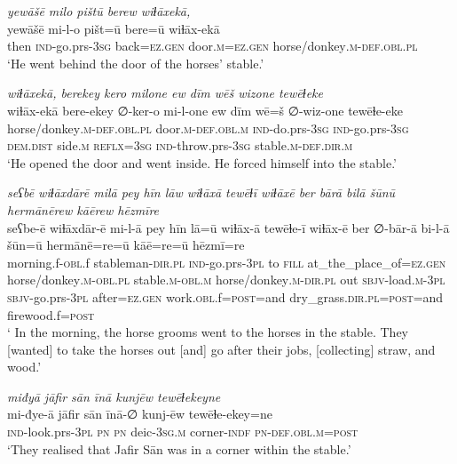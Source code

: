 \ea \label{ŠJ.63}
\textit{yewāšē milo pištū berew wiɫāxekā,} \\ 
\gll yewāšē mi-l-o pišt=ū bere=ū wiɫāx-ekā \\ 
 then \textsc{ind-}go.prs\textsc{-3sg} back\textsc{=ez.gen} door\textsc{.m}\textsc{=ez.gen} horse/donkey\textsc{.m}\textsc{-def}\textsc{.obl}\textsc{.pl} \\ 
\glt `He went behind the door of the horses’ stable.'
\z 
 
\ea \label{ŠJ.64}
\textit{wiɫāxekā, berekey kero milone ew dīm wēš wizone tewēɫeke} \\ 
\gll wiɫāx-ekā bere-ekey ∅-ker-o mi-l-one ew dīm wē=š ∅-wiz-one tewēɫe-eke \\ 
 horse/donkey\textsc{.m}\textsc{-def}\textsc{.obl}\textsc{.pl} door\textsc{.m}\textsc{-def}\textsc{.obl}\textsc{.m} \textsc{ind-}do.prs\textsc{-3sg} \textsc{ind-}go.prs\textsc{-3sg} \textsc{dem.dist} side\textsc{.m} \textsc{reflx}\textsc{=3sg} \textsc{ind-}throw.prs\textsc{-3sg} stable\textsc{.m}\textsc{-def}\textsc{.dir}\textsc{.m} \\ 
\glt `He opened the door and went inside. He forced himself into the stable.'
\z 
 
\ea \label{ŠJ.66}
\textit{seʕbē wiɫāxdārē milā pey hīn lāw wiɫāxā tewēɫī wiɫāxē ber bārā bilā šūnū hermānērew kāērew hēzmīre} \\ 
\gll seʕbe-ē wiɫāxdār-ē mi-l-ā pey hīn lā=ū wiɫāx-ā tewēɫe-ī wiɫāx-ē ber ∅-bār-ā bi-l-ā šūn=ū hermānē=re=ū kāē=re=ū hēzmī=re \\ 
 morning.f\textsc{-obl}.f stableman\textsc{-dir}\textsc{.pl} \textsc{ind-}go.prs\textsc{-3pl} to \textsc{fill} at\_the\_place\_of\textsc{=ez.gen} horse/donkey\textsc{.m}\textsc{-obl}\textsc{.pl} stable\textsc{.m}\textsc{-obl}\textsc{.m} horse/donkey\textsc{.m}\textsc{-dir}\textsc{.pl} out \textsc{sbjv-}load\textsc{.m}\textsc{-3pl} \textsc{sbjv-}go.prs\textsc{-3pl} after\textsc{=ez.gen} work\textsc{.obl}.f\textsc{=\textsc{post}}=and dry\_grass\textsc{.dir}\textsc{.pl}\textsc{=\textsc{post}}=and firewood.f\textsc{=\textsc{post}} \\ 
\glt ` In the morning, the horse grooms went to the horses in the stable. They [wanted] to take the horses out [and] go after their jobs, [collecting] straw, and wood.'
\z 
 
\ea \label{ŠJ.67}
\textit{miđyā jāfir sān īnā kunjēw tewēɫekeyne} \\ 
\gll mi-đye-ā jāfir sān īnā-∅ kunj-ēw tewēɫe-ekey=ne \\ 
 \textsc{ind-}look.prs\textsc{-3pl} \textsc{pn} \textsc{pn} deic\textsc{-3sg}\textsc{.m} corner\textsc{-indf} \textsc{pn}\textsc{-def}\textsc{.obl}\textsc{.m}\textsc{=\textsc{post}} \\ 
\glt `They realised that Jafir Sān was in a corner within the stable.'
\z 
 
